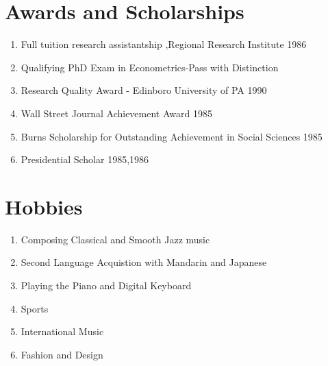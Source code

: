 \documentclass{ResumeDesignFormat1}
\begin{document}
\section{Awards and Scholarships}
\begin{enumerate} \itemsep -2pt
\item Full tuition research assistantship ,Regional Research Institute 1986  \\
\item Qualifying PhD Exam in Econometrics-Pass with Distinction\\
\item Research Quality Award - Edinboro University of PA 1990\\
\item Wall Street Journal Achievement Award 1985\\
\item Burns Scholarship for Outstanding Achievement in Social Sciences 1985\\
\item Presidential Scholar 1985,1986\\
\end{enumerate}
\section{Hobbies}

\begin{enumerate}
\item Composing Classical and Smooth Jazz music
\item Second Language Acquistion with Mandarin and Japanese
\item Playing the Piano and Digital Keyboard 
\item Sports
\item International Music
\item Fashion and Design
\end{enumerate}
\end{document}
